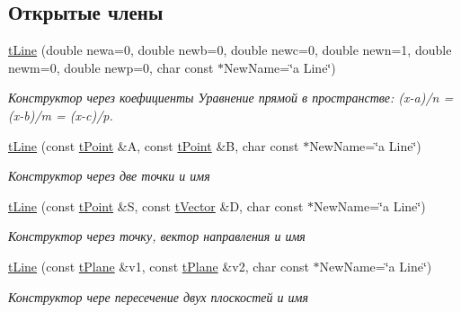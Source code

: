 \subsection*{Открытые члены}
\begin{DoxyCompactItemize}
\item 
\hyperlink{classtLine_ab61e326194db410630307c04cbbaf301}{t\+Line} (double newa=0, double newb=0, double newc=0, double newn=1, double newm=0, double newp=0, char const $\ast$New\+Name=\char`\"{}a Line\char`\"{})
\begin{DoxyCompactList}\small\item\em Конструктор через коефициенты  Уравнение прямой в пространстве\+: (x-\/a)/n = (x-\/b)/m = (x-\/c)/p. \end{DoxyCompactList}\item 
\mbox{\label{classtLine_a8af9012ac69b257b296c9104a6f6fda7}} 
\hyperlink{classtLine_a8af9012ac69b257b296c9104a6f6fda7}{t\+Line} (const \hyperlink{classtPoint}{t\+Point} \&A, const \hyperlink{classtPoint}{t\+Point} \&B, char const $\ast$New\+Name=\char`\"{}a Line\char`\"{})
\begin{DoxyCompactList}\small\item\em Конструктор через две точки и имя \end{DoxyCompactList}\item 
\mbox{\label{classtLine_a5ee3acc8febba1e9f9473be6399341c8}} 
\hyperlink{classtLine_a5ee3acc8febba1e9f9473be6399341c8}{t\+Line} (const \hyperlink{classtPoint}{t\+Point} \&S, const \hyperlink{classtVector}{t\+Vector} \&D, char const $\ast$New\+Name=\char`\"{}a Line\char`\"{})
\begin{DoxyCompactList}\small\item\em Конструктор через точку, вектор направления и имя \end{DoxyCompactList}\item 
\mbox{\label{classtLine_a9a1dbb658383a93138ed00d8893c590b}} 
\hyperlink{classtLine_a9a1dbb658383a93138ed00d8893c590b}{t\+Line} (const \hyperlink{classtPlane}{t\+Plane} \&v1, const \hyperlink{classtPlane}{t\+Plane} \&v2, char const $\ast$New\+Name=\char`\"{}a Line\char`\"{})
\begin{DoxyCompactList}\small\item\em Конструктор чере пересечение двух плоскостей и имя \end{DoxyCompactList}\item 

\end{DoxyCompactItemize}
